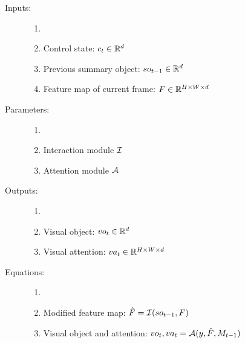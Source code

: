 

\begin{description}
	\item[Inputs:] 
	\begin{enumerate}
		\item[]
		\item Control state: $c_t \in \mathbb{R}^d$	
		\item Previous summary object: $so_{t-1} \in \mathbb{R}^d$
		\item Feature map of current frame: $F \in \mathbb{R}^{H \times W \times d}$
	\end{enumerate}
	
	\item[Parameters:] 
	\begin{enumerate}
		\item[]
		\item Interaction module $\mathcal{I}$
		\item Attention module $\mathcal{A}$
	\end{enumerate}
	
	\item[Outputs:] 
	\begin{enumerate}
		\item[]
		\item Visual object: $vo_t \in  \mathbb{R}^d$
		\item Visual attention: $va_t  \in \mathbb{R}^{H \times W \times d}$
	\end{enumerate}
	
	\item[Equations:]
	\begin{enumerate}
		\item[]
		\item Modified feature map: $\hat{F} = \mathcal{I}(so_{t-1}, F)$
		\item Visual object and attention: $vo_t, va_t = \mathcal{A}(y, \hat{F}, M_{t-1})$
	\end{enumerate}
\end{description}

